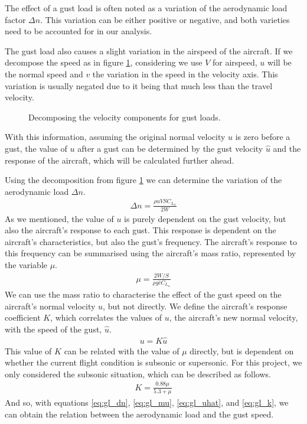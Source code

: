 \documentclass[english,fira]{ist-report}
\begin{document}
The effect of a gust load is often noted as a variation of the aerodynamic load factor $\Delta n$. This variation can be either positive or negative, and both varieties need to be accounted for in our analysis.

The gust load also causes a slight variation in the airspeed of the aircraft. If we decompose the speed as in figure \ref{fig:v_gustloads}, considering we use $V$ for airspeed, $u$ will be the normal speed and $v$ the variation in the speed in the velocity axis. This variation is usually negated due to it being that much less than the travel velocity.
\begin{figure}[ht]
    \centering
    \caption{Decomposing the velocity components for gust loads.}
    \label{fig:v_gustloads}
\end{figure}
With this information, assuming the original normal velocity $u$ is zero before a gust, the value of $u$ after a gust can be determined by the gust velocity $\hat{u}$ and the response of the aircraft, which will be calculated further ahead.

Using the decomposition from figure \ref{fig:v_gustloads} we can determine the variation of the aerodynamic load $\Delta n$.
\begin{gather}\label{eq:gl_dn}
    \Delta n = \frac{\rho uVSC_{L_\alpha}}{2W}
\end{gather}
As we mentioned, the value of $u$ is purely dependent on the gust velocity, but also the aircraft's response to each gust. This response is dependent on the aircraft's characteristics, but also the gust's frequency. The aircraft's response to this frequency can be summarised using the aircraft's mass ratio, represented by the variable $\mu$.
\begin{gather}\label{eq:gl_mu}
    \mu = \frac{2W/S}{\rho g\bar{c}C_{L_\alpha}}
\end{gather}
We can use the mass ratio to characterise the effect of the gust speed on the aircraft's normal velocity $u$, but not directly. We define the aircraft's response coefficient $K$, which correlates the values of $u$, the aircraft's new normal velocity, with the speed of the gust, $\hat{u}$.
\begin{gather}\label{eq:gl_uhat}
    u = K\hat{u}
\end{gather}
This value of $K$ can be related with the value of $\mu$ directly, but is dependent on whether the current flight condition is subsonic or supersonic. For this project, we only considered the subsonic situation, which can be described as follows.
\begin{gather}\label{eq:gl_k}
    K = \frac{0.88\mu}{5.3 + \mu}
\end{gather}
And so, with equations \ref{eq:gl_dn}, \ref{eq:gl_mu}, \ref{eq:gl_uhat}, and \ref{eq:gl_k}, we can obtain the relation between the aerodynamic load and the gust speed.
\end{document}
